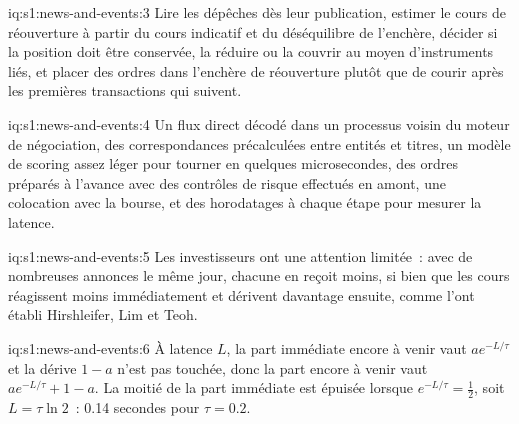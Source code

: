 \begin{solution}{iq:s1:news-and-events:3}
Lire les dépêches dès leur publication, estimer le cours de réouverture à partir du cours indicatif et du déséquilibre de l'enchère, décider si la position doit être conservée,
la réduire ou la couvrir au moyen d'instruments liés, et placer des ordres dans l'enchère de réouverture plutôt que de courir après les premières transactions qui suivent.
\end{solution}

\begin{solution}{iq:s1:news-and-events:4}
Un flux direct décodé dans un processus voisin du moteur de négociation, des correspondances précalculées entre entités et titres, un modèle de scoring assez léger pour tourner en
quelques microsecondes, des ordres préparés à l'avance avec des contrôles de risque effectués en amont, une colocation avec la bourse, et des horodatages à chaque étape pour mesurer la latence.
\end{solution}

\begin{solution}{iq:s1:news-and-events:5}
Les investisseurs ont une attention limitée~: avec de nombreuses annonces le même jour, chacune en reçoit moins, si bien que les cours réagissent moins immédiatement et dérivent davantage ensuite, comme
l'ont établi Hirshleifer, Lim et Teoh.
\end{solution}

\begin{solution}{iq:s1:news-and-events:6}
À latence $L$, la part immédiate encore à venir vaut $a e^{-L/\tau}$ et la dérive $1 - a$ n'est pas touchée, donc la part encore à venir vaut $a e^{-L/\tau} + 1 - a$.
La moitié de la part immédiate est épuisée lorsque $e^{-L/\tau} = \tfrac12$, soit $L = \tau \ln 2$~: 0.14 secondes pour $\tau = 0.2$.
\end{solution}

